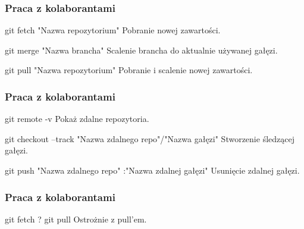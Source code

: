 \documentclass[9pt]{beamer}
\begin{document}
		
	\begin{frame}
		\frametitle{Praca z kolaborantami}

			\begin{block}{git fetch "Nazwa repozytorium"}
				Pobranie nowej zawartości.
			\end{block}

			\begin{block}{git merge "Nazwa brancha"}
				Scalenie brancha do aktualnie używanej gałęzi.
			\end{block}	
			
			\begin{block}{git pull "Nazwa repozytorium"}
				Pobranie i scalenie nowej zawartości.
			\end{block}	
					
						
	\end{frame}
	
		
	\begin{frame}
		\frametitle{Praca z kolaborantami}

			\begin{block}{git remote -v}
				Pokaż zdalne repozytoria.
			\end{block}	

			\begin{block}{git checkout --track "Nazwa zdalnego repo"/"Nazwa gałęzi"}
				Stworzenie śledzącej gałęzi.
			\end{block}	
			
			\begin{block}{git push "Nazwa zdalnego repo" :"Nazwa zdalnej gałęzi"}
				Usunięcie zdalnej gałęzi.
			\end{block}	
						
	\end{frame}
	
		
	\begin{frame}
		\frametitle{Praca z kolaborantami}

			\begin{block}{git fetch ? git pull}
				Ostrożnie z pull'em.
			\end{block}
					
						
	\end{frame}
	
		
\end{document}
